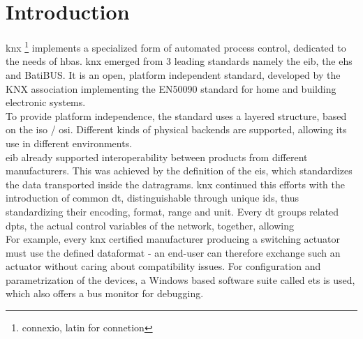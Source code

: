 \label{chap3}
\section{Introduction}

\gls{knx} \footnote{connexio, latin for connetion} implements a specialized form of automated process control, dedicated to the needs of \gls{hbas}. \gls{knx}
emerged from 3 leading standards namely the \gls{eib}, the \gls{ehs} and BatiBUS. It is an open, platform independent standard,
developed by the KNX association implementing the EN50090 standard for home and building electronic systems.
\\
To provide platform independence, the standard uses a layered structure, based on the \gls{iso} / \gls{osi}. Different kinds of physical backends are supported,
allowing its use in different environments.
\\
\gls{eib} already supported interoperability between products from different manufacturers. This was achieved by
the definition of the \gls{eis}, which standardizes
the data transported inside the datragrams. \gls{knx} continued this efforts with the introduction of common \gls{dt}, distinguishable through unique ids, thus
standardizing their encoding, format, range and unit.
Every \gls{dt} groups related \glspl{dpt}, the actual control variables of the network, together, allowing 
\\
For example, every \gls{knx} 
certified manufacturer producing a switching actuator must use the defined dataformat - an end-user can therefore exchange such an actuator without caring
about compatibility issues. For configuration and parametrization of the devices, a Windows based software suite called \gls{ets} is used, which also offers
a bus monitor for debugging.
